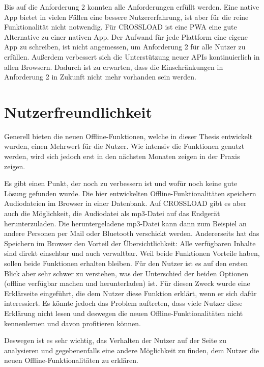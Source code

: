\clearpage

Bis auf die Anforderung 2 konnten alle Anforderungen erfüllt werden. Eine native App bietet in vielen Fällen eine bessere Nutzererfahrung, ist aber für die reine Funktionalität nicht notwendig. Für CROSSLOAD ist eine \ac{PWA} eine gute Alternative zu einer nativen App. Der Aufwand für jede Plattform eine eigene App zu schreiben, ist nicht angemessen, um Anforderung 2 für alle Nutzer zu erfüllen. Außerdem verbessert sich die Unterstützung neuer \acp{API} kontinuierlich in allen Browsern. Dadurch ist zu erwarten, dass die Einschränkungen in Anforderung 2 in Zukunft nicht mehr vorhanden sein werden.

\section{Nutzerfreundlichkeit}
Generell bieten die neuen Offline-Funktionen, welche in dieser Thesis entwickelt wurden, einen Mehrwert für die Nutzer. Wie intensiv die Funktionen genutzt werden, wird sich jedoch erst in den nächsten Monaten zeigen in der Praxis zeigen. 

Es gibt einen Punkt, der noch zu verbessern ist und wofür noch keine gute Lösung gefunden wurde. Die hier entwickelten Offline-Funktionalitäten speichern Audiodateien im Browser in einer Datenbank. Auf CROSSLOAD gibt es aber auch die Möglichkeit, die Audiodatei als mp3-Datei auf das Endgerät herunterzuladen. Die heruntergeladene mp3-Datei kann dann zum Beispiel an andere Personen per Mail oder Bluetooth verschickt werden. Andererseits hat das Speichern im Browser den Vorteil der Übersichtlichkeit: Alle verfügbaren Inhalte sind direkt einsehbar und auch verwaltbar. Weil beide Funktionen Vorteile haben, sollen beide Funktionen erhalten bleiben. Für den Nutzer ist es auf den ersten Blick aber sehr schwer zu verstehen, was der Unterschied der beiden Optionen (offline verfügbar machen und herunterladen) ist. Für diesen Zweck wurde eine Erklärseite eingeführt, die dem Nutzer diese Funktion erklärt, wenn er sich dafür interessiert. Es könnte jedoch das Problem auftreten, dass viele Nutzer diese Erklärung nicht lesen und deswegen die neuen Offline-Funktionalitäten nicht kennenlernen und davon profitieren können. 

Deswegen ist es sehr wichtig, das Verhalten der Nutzer auf der Seite zu analysieren und gegebenenfalls eine andere Möglichkeit zu finden, dem Nutzer die neuen Offline-Funktionalitäten zu erklären.
